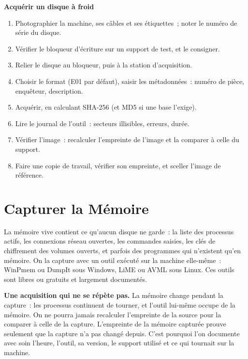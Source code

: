 \begin{boxprocedure}
\textbf{Acquérir un disque à froid}
\begin{enumerate}
    \item Photographier la machine, ses câbles et ses étiquettes~; noter le
          numéro de série du disque.
    \item Vérifier le bloqueur d'écriture sur un support de test, et le
          consigner.
    \item Relier le disque au bloqueur, puis à la station d'acquisition.
    \item Choisir le format (E01 par défaut), saisir les métadonnées~:
          numéro de pièce, enquêteur, description.
    \item Acquérir, en calculant SHA-256 (et MD5 si une base l'exige).
    \item Lire le journal de l'outil~: secteurs illisibles, erreurs,
          durée.
    \item Vérifier l'image~: recalculer l'empreinte de l'image et la
          comparer à celle du support.
    \item Faire une copie de travail, vérifier son empreinte, et sceller
          l'image de référence.
\end{enumerate}
\end{boxprocedure}

\section{Capturer la Mémoire}
\label{sec:c03-memoire}

La mémoire vive contient ce qu'aucun disque ne garde~: la liste des
processus actifs, les connexions réseau ouvertes, les commandes saisies, les
clés de chiffrement des volumes ouverts, et parfois des programmes qui
n'existent qu'en mémoire. On la capture avec un outil exécuté sur la machine
elle-même~: WinPmem ou DumpIt sous Windows, LiME ou AVML sous Linux. Ces
outils sont libres ou gratuits et largement documentés.

\begin{boxinfo}
\textbf{Une acquisition qui ne se répète pas.} La mémoire change pendant la
capture~: les processus continuent de tourner, et l'outil lui-même occupe de
la mémoire. On ne pourra jamais recalculer l'empreinte de la source pour la
comparer à celle de la capture. L'empreinte de la mémoire capturée prouve
seulement que la capture n'a pas changé depuis. C'est pourquoi l'on
documente avec soin l'heure, l'outil, sa version, le support utilisé et ce
qui tournait sur la machine.
\end{boxinfo}

